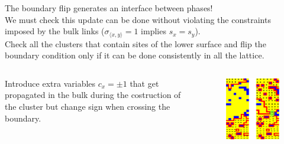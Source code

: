 \documentclass[12pt,handout]{beamer}
\begin{document}
\begin{frame}
\begin{center}
{ \large The boundary flip generates an interface between phases!\\ } 
\vspace{20pt}
We must check this update can be done without violating the constraints imposed by the bulk links ($\sigma_{\langle x, y \rangle} = 1$ implies $s_x = s_y$).\\
\vspace{20pt}
Check all the clusters that contain sites of the lower surface and flip the boundary condition only if it can be done consistently in all the lattice.
\end{center}
\end{frame}

\begin{frame}
\begin{center}

\begin{columns}
\begin{column}{0.30\textwidth}
\begin{center}
Introduce extra variables $c_{x} = \pm 1$ that get propagated in the bulk during the costruction of the cluster but change sign when crossing the boundary.
\end{center}
\end{column}
\begin{column}{0.70\textwidth}

\begin{figure}[!htb]
\centering
\includegraphics[scale=0.5]{extra.png}
\end{figure}

\end{column}
\end{columns}

\end{center}
\end{frame}
\end{document}
